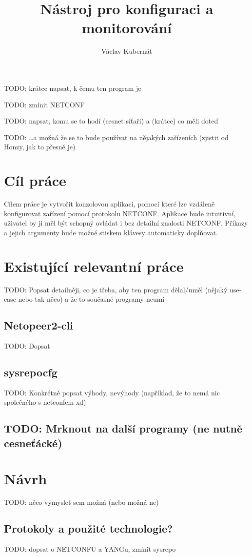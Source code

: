 \documentclass[thesis=B,czech]{FITthesis}[2019/03/06]
\title{Nástroj pro konfiguraci a monitorování}
\author{Václav Kubernát}
\begin{document}
\begin{introduction}
TODO: krátce napsat, k čemu ten program je

TODO: zmínit NETCONF

TODO: napsat, komu se to hodí (cesnet síťaři) a (krátce) co měli doteď

TODO: \ldots a možná že se to bude používat na nějakých zařízeních (zjistit od Honzy, jak to přesně je)
\end{introduction}


\chapter{Cíl práce} 
Cílem práce je vytvořit konzolovou aplikaci, pomocí které lze vzdáleně konfigurovat zařízení pomocí protokolu NETCONF\@. Aplikace bude intuitivní, uživatel by ji měl být schopný ovládat i bez detailní znalosti NETCONF\@. Příkazy a jejich argumenty bude možné stiskem klávesy automaticky doplňovat.


\chapter{Existující relevantní práce}
TODO: Popsat detailněji, co je třeba, aby ten program dělal/uměl (nějaký use-case nebo tak něco) a že to současné programy neumí
\section{Netopeer2-cli}
TODO: Dopsat
\section{sysrepocfg}
TODO: Konkrétně popsat výhody, nevýhody (například, že to nemá nic společného s netconfem xd)
\section{TODO: Mrknout na další programy (ne nutně cesneťácké)}


\chapter{Návrh}
TODO: něco vymyslet sem možná (nebo možná ne)

\section{Protokoly a použité technologie?}
TODO: dopsat o NETCONFU a YANGu, zmínit sysrepo
\end{document}
